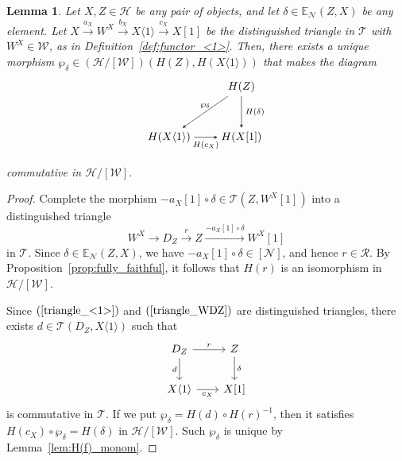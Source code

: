\documentclass[a4paper,reqno,10pt]{amsart}
\DeclareRobustCommand{\darkblueedit}[1]{#1}
\newtheorem{lemma}[lemma]{Lemma}
\theoremstyle{definition}
\theoremstyle{definition}
\theoremstyle{definition}
\theoremstyle{definition}
\theoremstyle{plain}
\newcommand{\BE}{\mathbb{E}}
\newcommand{\CH}{\mathcal{H}}
\newcommand{\CN}{\mathcal{N}}
\newcommand{\CR}{\mathcal{R}}
\newcommand{\CT}{\mathcal{T}}
\newcommand{\CW}{\mathcal{W}}
\begin{document}
\begin{lemma}\label{lemma:construction_of_dell}
Let $X,Z\in\CH$ be any pair of objects, and let $\delta\in\BE_{\CN}(Z,X)$ be any element.
Let %
$X\xrightarrow{a_X}W^X\xrightarrow{b_X}X\langle 1\rangle\xrightarrow{c_X}X[1]$
be the distinguished triangle in $\CT$ with $W^X\in\CW$, as in Definition~\ref{def:functor_<1>}.
Then, there exists a unique morphism $\wp_{\delta}\in(\CH/[\CW])(H(Z),H(X\langle1\rangle))$ that makes the diagram
\[
\begin{tikzpicture}[>=stealth]
\node (2) at (2,0.8) {$H(Z)$};
\node (4) at (-0.3,-0.8) {$H(X\langle1\rangle)$};
\node (5) at (2,-0.8) {$H(X[1])$};
\draw[->] (2) -- node[above,font=\scriptsize] {$\wp_{\delta}$} (4);
\draw[->] (4) -- node[below,font=\scriptsize] {$H(c_X)$} (5);
\draw[->] (2) -- node[right,font=\scriptsize] {$H(\delta)$} (5);
\end{tikzpicture}
\]
commutative in $\CH/[\CW]$.
\end{lemma}
\begin{proof}
Complete the morphism $-a_X[1]\circ\delta\in\CT(Z,W^X[1])$ into a distinguished triangle
\begin{equation}\label{triangle_WDZ}
W^X\to D_Z\xrightarrow{r}Z\xrightarrow{-a_X[1]\circ\delta}W^X[1]
\end{equation}
in $\CT$. Since $\delta\in\BE_{\CN}(Z,X)$, we have $-a_X[1]\circ\delta\in [\CN]$, and hence $r\in\CR$. By Proposition~\ref{prop:fully_faithful}, it follows that $H(r)$ is an isomorphism in $\CH/[\CW]$.

Since $(\ref{triangle_<1>})$ and $(\ref{triangle_WDZ})$ are distinguished triangles, \darkblueedit{there exists} $d\in\CT(D_Z,X\langle1\rangle)$ such that
\[
\begin{tikzcd}[row sep=0.7cm, column sep=0.7cm]
D_Z\arrow[r, "r"]
  \arrow[d, swap, "d"] %
&Z\arrow[d, "\delta"]
\\
X\langle1\rangle \arrow[r, swap, "c_X"]
&X[1]
\end{tikzcd}
\]
is commutative in $\CT$. If we put $\wp_{\delta}=H(d)\circ H(r)^{-1}$, then it satisfies $H(c_X)\circ \wp_{\delta}=H(\delta)$ in $\CH/[\CW]$.
Such $\wp_{\delta}$ is unique by Lemma~\ref{lem:H(f)_monom}. 
\end{proof}
\end{document}
